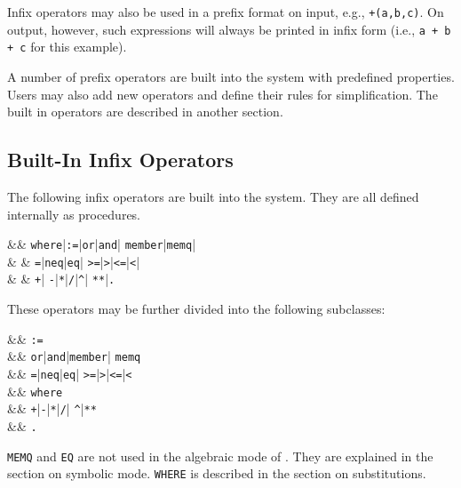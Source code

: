 Infix operators may also be used in a prefix format on input, e.g.,
\texttt{+(a,b,c)}.  On output, however, such expressions will always be
printed in infix form (i.e., \texttt{a + b + c} for this example).

A number of prefix operators are built into the system with predefined
properties. Users may also add new operators and define their rules for
simplification. The built in operators are described in another section.

\subsection*{Built-In Infix Operators}
\hypertarget{operator:MEMBER}{}
\hypertarget{operator:MEMQ}{}
\hypertarget{operator:EQ}{}
\hypertarget{operator:NEQ}{}
\hypertarget{reserved:plusop}{}
\hypertarget{reserved:minusop}{}
\hypertarget{reserved:timesop}{}
\hypertarget{reserved:quotientop}{}
\hypertarget{reserved:caretop}{}
\hypertarget{reserved:exptop}{}
\hypertarget{reserved:greaterop}{}
\hypertarget{reserved:lessop}{}
\hypertarget{reserved:geqop}{}
\hypertarget{reserved:leqop}{}
\hypertarget{reserved:equalop}{}

The following infix operators are built into the
system.  They are all defined internally as procedures.
\begin{syntaxtable}
 &\bnfprod & \texttt{where}|\texttt{:=}|\texttt{or}|\texttt{and}|
                                 \texttt{member}|\texttt{memq}|\\
                        &       & \texttt{=}|\texttt{neq}|\texttt{eq}|
                                 \texttt{>=}|\texttt{>}|\texttt{<=}|\texttt{<}|\\
         &  &         \texttt{+}|
                     \texttt{-}|\texttt{*}|\texttt{/}|\texttt{\textasciicircum}|
                     \texttt{**}|\texttt{.}
\end{syntaxtable}
These operators may be further divided into the following subclasses:
\begin{syntaxtable}
      &\bnfprod & \texttt{:=} \\
         &\bnfprod & \texttt{or}|\texttt{and}|\texttt{member}|
                                           \texttt{memq} \\
      &\bnfprod & \texttt{=}|\texttt{neq}|\texttt{eq}|
                                           \texttt{>=}|\texttt{>}|\texttt{<=}|\texttt{<}\\
    &\bnfprod & \texttt{where} \\
      &\bnfprod & \texttt{+}|\texttt{-}|\texttt{*}|\texttt{/}|
                                           \texttt{\textasciicircum}|\texttt{**} \\
    &\bnfprod & \texttt{.}
\end{syntaxtable}
\texttt{MEMQ} and \texttt{EQ} are not used in the algebraic mode of
{\REDUCE}.  They are explained in the section on symbolic mode.
\texttt{WHERE} is described in the section on substitutions.


